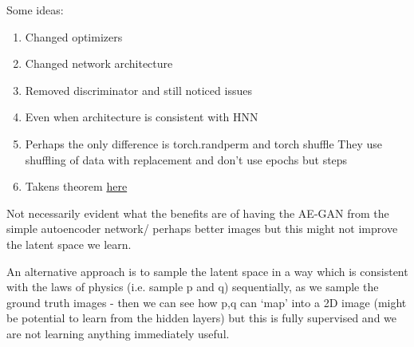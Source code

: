 \documentclass{article}
\begin{document}
Some ideas:

\begin{enumerate}

\item Changed optimizers
\item Changed network architecture
\item Removed discriminator and still noticed issues
\item Even when architecture is consistent with HNN
\item Perhaps the only difference is torch.randperm and torch shuffle
They use shuffling of data with replacement and don’t use epochs but steps
\item Takens theorem \href{https://en.wikipedia.org/wiki/Takens%27s_theorem}{here}
\end{enumerate}


Not necessarily evident what the benefits are of having the AE-GAN from the simple autoencoder network/ perhaps better images but this might not improve the latent space we learn.

An alternative approach is to sample the latent space in a way which is consistent with the laws of physics (i.e. sample p and q) sequentially, as we sample the ground truth images - then we can see how p,q can ‘map’ into a 2D image (might be potential to learn from the hidden layers) but this is fully supervised and we are not learning anything immediately useful.
\end{document}
